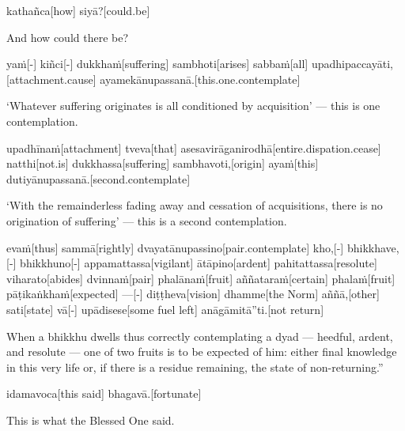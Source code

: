 \begin{samepage}
\begingl[glneveryline={\PaliGlossA,\PaliGlossB}]
kathañca[how] siyā?[could.be]
\endgl
\nopagebreak
\linespread{0.5}
\begin{spacin}{0.2}
{\PaliGlossFT And how could there be?}
\end{spacin}
\vskip 12pt
\end{samepage}
\begin{samepage}
\begingl[glneveryline={\PaliGlossA,\PaliGlossB}]
yaṁ[-] kiñci[-] dukkhaṁ[suffering] sambhoti[arises] sabbaṁ[all] upadhipaccayāti,[attachment.cause] ayamekānupassanā.[this.one.contemplate]
\endgl
\nopagebreak
\linespread{0.5}
\begin{spacin}{0.2}
{\PaliGlossFT ‘Whatever suffering originates is all conditioned by acquisition’ — ­this is one contemplation.}
\end{spacin}
\vskip 12pt
\end{samepage}
\begin{samepage}
\begingl[glneveryline={\PaliGlossA,\PaliGlossB}]
upadhīnaṁ[attachment] tveva[that] asesavirāganirodhā[entire.dispation.cease] natthi[not.is] dukkhassa[suffering] sambhavoti,[origin] ayaṁ[this] dutiyānupassanā.[second.contemplate]
\endgl
\nopagebreak
\linespread{0.5}
\begin{spacin}{0.2}
{\PaliGlossFT ‘With the remainderless fading away and cessation of acquisitions, there is no origination of suffering’ — ­this is a second contemplation.}
\end{spacin}
\vskip 12pt
\end{samepage}
\begin{samepage}
\begingl[glneveryline={\PaliGlossA,\PaliGlossB}]
evaṁ[thus] sammā[rightly] dvayatānupassino[pair.contemplate] kho,[-] bhikkhave,[-] bhikkhuno[-] appamattassa[vigilant] ātāpino[ardent] pahitattassa[resolute] viharato[abides] dvinnaṁ[pair] phalānaṁ[fruit] aññataraṁ[certain] phalaṁ[fruit] pāṭikaṅkhaṁ[expected] —[-] diṭṭheva[vision] dhamme[the Norm] aññā,[other] sati[state] vā[-] upādisese[some fuel left] anāgāmitā”ti.[not return]
\endgl
\nopagebreak
\linespread{0.5}
\begin{spacin}{0.2}
{\PaliGlossFT When a bhikkhu dwells thus correctly contemplating a dyad — heedful, ardent, and resolute — one of two fruits is to be expected of him: either final knowledge in this very life or, if there is a residue remaining, the state of non-returning.”}
\end{spacin}
\vskip 12pt
\end{samepage}
\begin{samepage}
\begingl[glneveryline={\PaliGlossA,\PaliGlossB}]
idamavoca[this said] bhagavā.[fortunate]
\endgl
\nopagebreak
\linespread{0.5}
\begin{spacin}{0.2}
{\PaliGlossFT This is what the Blessed One said.}
\end{spacin}
\vskip 12pt
\end{samepage}
